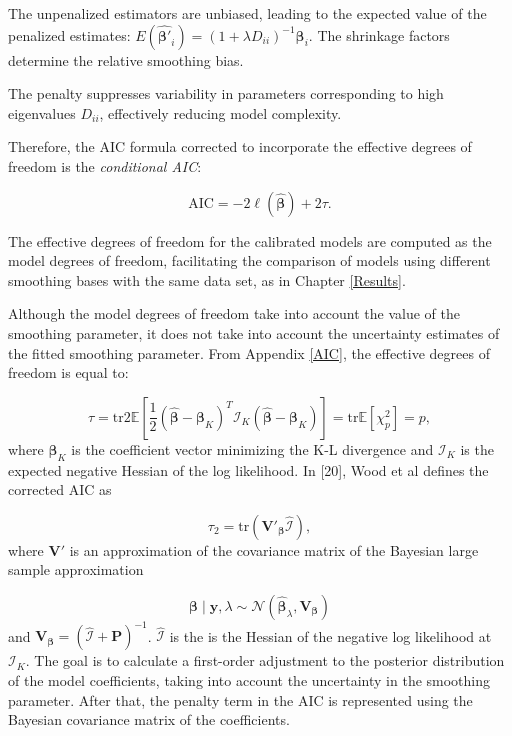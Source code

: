 \documentclass[
11pt, %
oneside, %
english, %
singlespacing, %
]{macthesis} %
\begin{document}
The unpenalized estimators are unbiased, leading to the expected value of the penalized estimates: \(E(\hat{\boldsymbol{\beta}'}_i) = (1 + \lambda D_{ii})^{-1} \boldsymbol{\beta}_i\). The shrinkage factors determine the relative smoothing bias.

The penalty suppresses variability in parameters corresponding to high eigenvalues \(D_{ii}\), effectively reducing model complexity.

Therefore, the AIC formula corrected to incorporate the effective degrees of freedom is the \emph{conditional AIC}:

\begin{equation}
\text{AIC} = -2 \ell(\hat{\boldsymbol{\beta}}) + 2 \tau.
\label{eq:corrected AIC}
\end{equation}

The effective degrees of freedom for the calibrated models are computed as the model degrees of freedom, facilitating the comparison of models using different smoothing bases with the same data set, as in Chapter \ref{Results}.

Although the model degrees of freedom take into account the value of the smoothing parameter, it does not take into account the uncertainty estimates of the fitted smoothing parameter. From Appendix \ref{AIC}, the effective degrees of freedom is equal to:

\[
\tau = \text{tr}2\mathbb{E}\left[\frac{1}{2} (\hat{\boldsymbol{\beta}} - \boldsymbol{\beta}_K)^T \boldsymbol{ \mathcal{I}}_K (\hat{\boldsymbol{\beta}} - \boldsymbol{\beta}_K)\right] = \text{tr}  \mathbb{E}[\chi^2_p] = p,
\]
where \(\boldsymbol{\beta}_K\) is the coefficient vector minimizing the K-L divergence and \(\boldsymbol{ \mathcal{I}}_K\) is the expected negative Hessian of the log likelihood. In {[}20{]}, Wood et al defines the corrected AIC as

\begin{equation}
\tau_2 = \text{tr}(\mathbf{V}'_{\boldsymbol{\beta}}\hat{\boldsymbol{ \mathcal{I}}}),
\label{eq:corrected_aic}
\end{equation}
where \(\mathbf{V}'\) is an approximation of the covariance matrix of the Bayesian large sample approximation

\[
\boldsymbol{\beta} \mid \mathbf{y},\lambda \sim \mathcal{N}(\hat{\boldsymbol{\beta}}_{\lambda},\mathbf{V}_{\boldsymbol{\beta}})
\]
and \(\mathbf{V}_{\boldsymbol{\beta}} = (\hat{\boldsymbol{ \mathcal{I}}} + \mathbf{P})^{-1}\). \(\hat{\boldsymbol{ \mathcal{I}}}\) is the is the Hessian of the negative log likelihood at \(\boldsymbol{ \mathcal{I}}_K\). The goal is to calculate a first-order adjustment to the posterior distribution of the model coefficients, taking into account the uncertainty in the smoothing parameter. After that, the penalty term in the AIC is represented using the Bayesian covariance matrix of the coefficients.
\end{document}
